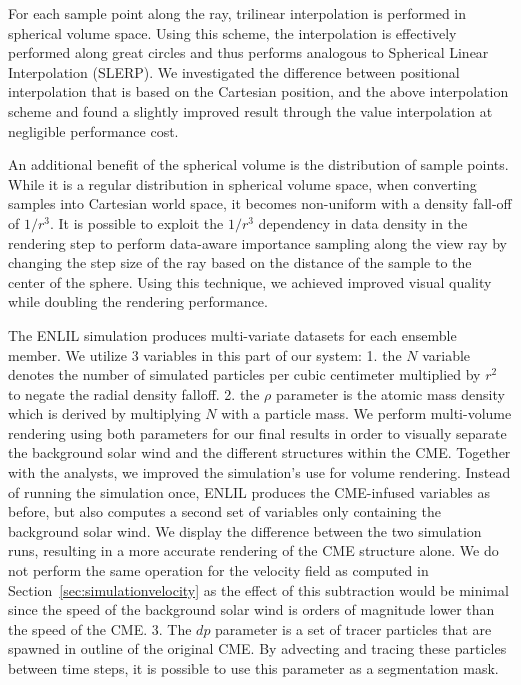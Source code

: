\documentclass[journal]{vgtc}                %
\begin{document}
 For each sample point along the ray, trilinear interpolation is performed in spherical volume space. Using this scheme, the interpolation is effectively performed along great circles and thus performs analogous to Spherical Linear Interpolation (SLERP). We investigated the difference between positional interpolation that is based on the Cartesian position, and the above interpolation scheme and found a slightly improved result through the value interpolation at negligible performance cost.

 An additional benefit of the spherical volume is the distribution of sample points. While it is a regular distribution in spherical volume space, when converting samples into Cartesian world space, it becomes non-uniform with a density fall-off of $1/r^3$. It is possible to exploit the $1/r^3$ dependency in data density in the rendering step to perform data-aware importance sampling along the view ray by changing the step size of the ray based on the distance of the sample to the center of the sphere. Using this technique, we achieved improved visual quality while doubling the rendering performance.

 The ENLIL simulation produces multi-variate datasets for each ensemble member. We utilize 3 variables in this part of our system: 1. the $N$ variable denotes the number of simulated particles per cubic centimeter multiplied by $r^2$ to negate the radial density falloff. 2. the $\rho$ parameter is the atomic mass density which is derived by multiplying $N$ with a particle mass. We perform multi-volume rendering using both parameters for our final results in order to visually separate the background solar wind and the different structures within the CME. Together with the analysts, we improved the simulation's use for volume rendering. Instead of running the simulation once, ENLIL produces the CME-infused variables as before, but also computes a second set of variables only containing the background solar wind. We display the difference between the two simulation runs, resulting in a more accurate rendering of the CME structure alone. We do not perform the same operation for the velocity field as computed in Section~\ref{sec:simulationvelocity} as the effect of this subtraction would be minimal since the speed of the background solar wind is orders of magnitude lower than the speed of the CME. 3. The $dp$ parameter is a set of tracer particles that are spawned in outline of the original CME. By advecting and tracing these particles between time steps, it is possible to use this parameter as a segmentation mask.
\end{document}
